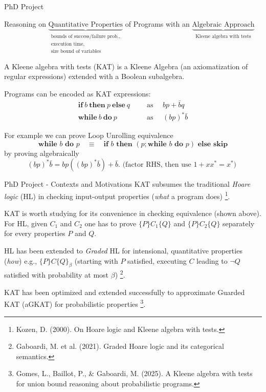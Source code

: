 \documentclass[xcolor=dvipsnames, aspectratio=169, 10pt]{beamer}
\begin{document}
\begin{frame}{PhD Project}
  \begin{center}
    Reasoning on $\underbrace{\text{Quantitative Properties}}_{\substack{\text{bounds of success/failure prob.,} \\ \text{execution time,} \\ \text{size bound of variables}}}$ of Programs with an $\underbrace{\text{Algebraic Approach}}_{\substack{\text{Kleene algebra with tests}}}$
  \end{center}

  A Kleene algebra with tests (KAT) is a Kleene Algebra (an axiomatization of regular expressions) extended with a Boolean subalgebra.

  Programs can be encoded as KAT expressions:
  \begin{align*}
    \textbf{if} \ b\  \textbf{then}\ p\ \textbf{else}\ q\ \quad & \text{ as } \quad bp+\bar{b}q   \\
    \textbf{while} \ b\  \textbf{do}\ p \quad                   & \text{ as } \quad (bp)^*\bar{b}
  \end{align*}

  For example we can prove Loop Unrolling equivalence
  $$\textbf{while } b \textbf{ do } p \quad\equiv\quad \textbf{if } b \textbf{ then } (p; \textbf{while } b \textbf{ do } p) \textbf{ else skip}$$ by proving algebraically
  $$(bp)^*\bar{b} = b p ((bp)^*\bar{b}) + \bar{b}. \text{ (factor RHS, then use $1+xx^* = x^*$) }$$
\end{frame}

\begin{frame}{PhD Project - Contexts and Motivations}
  KAT subsumes the traditional \textit{Hoare logic} (HL) in checking input-output properties (\textit{what} a program does) \footnote{Kozen, D. (2000). On Hoare logic and Kleene algebra with tests.}.

  KAT is worth studying for its convenience in checking equivalence (shown above). For HL, given $C_1$ and $C_2$ one has to prove $\{P\} C_1 \{Q\}$ and $\{P\} C_2 \{Q\}$ separately for every properties $P$ and $Q$.

  HL has been extended to \textit{Graded} HL for intensional, quantitative properties (\textit{how}) e.g., $\{P\} C \{Q\}_\beta$ (starting with $P$ satisfied, executing $C$ leading to $\neg Q$ satisfied with probability at most $\beta$) \footnote{Gaboardi, M. et al. (2021). Graded Hoare logic and its categorical semantics.}.

  KAT has been optimized and extended successfully to approximate Guarded KAT (aGKAT) for probabilistic properties \footnote{Gomes, L., Baillot, P., \& Gaboardi, M. (2025). A Kleene algebra with tests for union bound reasoning about probabilistic programs.}.
\end{frame}
\end{document}
